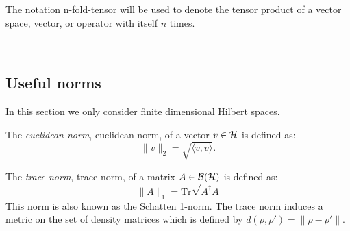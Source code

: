 The notation \gls{n-fold-tensor}  will be used to  denote the tensor product of a vector space, vector, or operator with itself $n$ times.



\



\subsection{Useful norms }
In this section we only consider finite dimensional Hilbert spaces.

\begin{definition} \label{eq:euclidean_distance}
  The \emph{euclidean norm}, \gls{euclidean-norm}, of a vector $v \in \mathcal{H} $ is defined as:
  \begin{equation*}
    \lVert v \rVert_{2} = \sqrt{\langle v, v\rangle}. 
    \end{equation*}
\end{definition}


\begin{definition}\label{def:trace-norm-matriz}
  The \emph{trace norm}, \gls{trace-norm}, of a matrix $A \in \mathcal{B}(\mathcal{H})$ is defined as:
  \begin{equation*} \label{eq:trace_norm_matrix_tr}
    \lVert A \rVert_{1} = \text{Tr} \sqrt{A^{\dagger}A}
  \end{equation*}
  This norm is also  known as the Schatten 1-norm. The trace norm induces a metric on the set of density matrices which is defined by $d(\rho, \rho') = \lVert \rho - \rho'\rVert$.
\end{definition}

